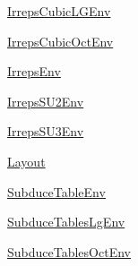 \begin{DoxyCompactItemize}
\item 
 \mbox{\hyperlink{namespaceHadron_1_1IrrepsCubicLGEnv}{Irreps\+Cubic\+L\+G\+Env}}
\item 
 \mbox{\hyperlink{namespaceHadron_1_1IrrepsCubicOctEnv}{Irreps\+Cubic\+Oct\+Env}}
\item 
 \mbox{\hyperlink{namespaceHadron_1_1IrrepsEnv}{Irreps\+Env}}
\item 
 \mbox{\hyperlink{namespaceHadron_1_1IrrepsSU2Env}{Irreps\+S\+U2\+Env}}
\item 
 \mbox{\hyperlink{namespaceHadron_1_1IrrepsSU3Env}{Irreps\+S\+U3\+Env}}
\item 
 \mbox{\hyperlink{namespaceHadron_1_1Layout}{Layout}}
\item 
 \mbox{\hyperlink{namespaceHadron_1_1SubduceTableEnv}{Subduce\+Table\+Env}}
\item 
 \mbox{\hyperlink{namespaceHadron_1_1SubduceTablesLgEnv}{Subduce\+Tables\+Lg\+Env}}
\item 
 \mbox{\hyperlink{namespaceHadron_1_1SubduceTablesOctEnv}{Subduce\+Tables\+Oct\+Env}}
\end{DoxyCompactItemize}

